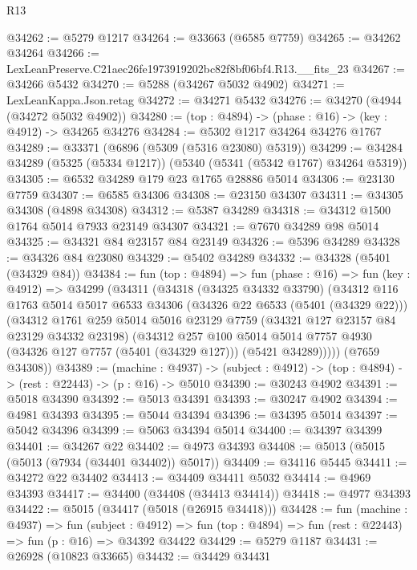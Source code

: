 \begin{lexlean}{R13}
\begin{coremodule}
@34262 := @5279 @1217
@34264 := @33663 (@6585 @7759)
@34265 := @34262 @34264
@34266 := LexLeanPreserve.C21aec26fe1973919202bc82f8bf06bf4.R13.__fits_23
@34267 := @34266 @5432
@34270 := @5288 (@34267 @5032 @4902)
@34271 := LexLeanKappa.Json.retag
@34272 := @34271 @5432
@34276 := @34270 (@4944 (@34272 @5032 @4902))
@34280 := (top : @4894) -> (phase : @16) -> (key : @4912) -> @34265 @34276
@34284 := @5302 @1217 @34264 @34276 @1767
@34289 := @33371 (@6896 (@5309 (@5316 @23080) @5319))
@34299 := @34284 @34289 (@5325 (@5334 @1217)) (@5340 (@5341 (@5342 @1767) @34264 @5319))
@34305 := @6532 @34289 @179 @23 @1765 @28886 @5014
@34306 := @23130 @7759
@34307 := @6585 @34306
@34308 := @23150 @34307
@34311 := @34305 @34308 (@4898 @34308)
@34312 := @5387 @34289
@34318 := @34312 @1500 @1764 @5014 @7933 @23149 @34307
@34321 := @7670 @34289 @98 @5014
@34325 := @34321 @84 @23157 @84 @23149
@34326 := @5396 @34289
@34328 := @34326 @84 @23080
@34329 := @5402 @34289
@34332 := @34328 (@5401 (@34329 @84))
@34384 := fun (top : @4894) =>
  fun (phase : @16) =>
  fun (key : @4912) =>
  @34299
    (@34311
      (@34318
        (@34325 @34332 @33790)
        (@34312
          @116
          @1763
          @5014
          @5017
          @6533
          @34306
          (@34326 @22 @6533 (@5401 (@34329 @22)))
          (@34312
            @1761
            @259
            @5014
            @5016
            @23129
            @7759
            (@34321 @127 @23157 @84 @23129 @34332 @23198)
            (@34312
              @257
              @100
              @5014
              @5014
              @7757
              @4930
              (@34326 @127 @7757 (@5401 (@34329 @127)))
              (@5421 @34289)))))
      (@7659 @34308))
@34389 := (machine : @4937) ->
  (subject : @4912) -> (top : @4894) -> (rest : @22443) -> (p : @16) -> @5010
@34390 := @30243 @4902
@34391 := @5018 @34390
@34392 := @5013 @34391
@34393 := @30247 @4902
@34394 := @4981 @34393
@34395 := @5044 @34394
@34396 := @34395 @5014
@34397 := @5042 @34396
@34399 := @5063 @34394 @5014
@34400 := @34397 @34399
@34401 := @34267 @22
@34402 := @4973 @34393
@34408 := @5013 (@5015 (@5013 (@7934 (@34401 @34402)) @5017))
@34409 := @34116 @5445
@34411 := @34272 @22 @34402
@34413 := @34409 @34411 @5032
@34414 := @4969 @34393
@34417 := @34400 (@34408 (@34413 @34414))
@34418 := @4977 @34393
@34422 := @5015 (@34417 (@5018 (@26915 @34418)))
@34428 := fun (machine : @4937) =>
  fun (subject : @4912) =>
  fun (top : @4894) => fun (rest : @22443) => fun (p : @16) => @34392 @34422
@34429 := @5279 @1187
@34431 := @26928 (@10823 @33665)
@34432 := @34429 @34431

\end{coremodule}
\end{lexlean}
